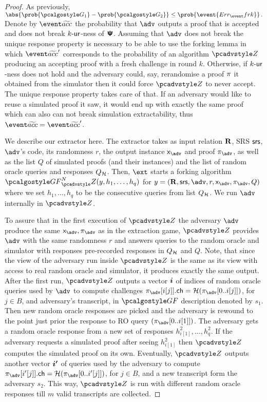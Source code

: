 \documentclass[runningheads,11pt]{llncs}
\def\vec#1{\mathchoice{\mbox{\boldmath$\displaystyle#1$}}
{\mbox{\boldmath$\textstyle#1$}} {\mbox{\boldmath$\scriptstyle#1$}}
{\mbox{\boldmath$\scriptscriptstyle#1$}}}
\theoremstyle{definition} \newtheorem{definition}[theorem]{Definition}
\begin{document}
\begin{proof}
   As previously, \( \abs{\prob{\game{1}} -
    \prob{\game{2}}} \leq \prob{\event{\errfrk}}\,. \) Denote by $\waccProb$ the
  probability that $\advse$ outputs a proof that is accepted and does not break
  ${k\text{-}\mathsf{ur}}$-ness of $\bm{\mathsf{\Psi}}$. Assuming that $\advse$ does not break the unique
  response property is necessary to be able to use the forking lemma in which
  $\waccProb'$ corresponds to the probability of an algorithm $\zdv$ producing
  an accepting proof with a fresh challenge in round $k$. Otherwise, if
  ${k\text{-}\mathsf{ur}}$-ness does not hold and the adversary could, say, rerandomise a proof
  $\pi$ it obtained from the simulator then it could force $\zdv$ to never
  accept. The unique response property takes care of that. If an adversary would
  like to reuse a simulated proof it saw, it would end up with exactly the same
  proof which can also can not break simulation extractability, thus
  $\waccProb=\waccProb'$.

  We describe our extractor here. The extractor takes as input relation $\mathbf{R}$,
  SRS $\mathsf{srs}$, $\advse$'s code, its randomness $r$, the output instance
  $\inp_{\advse}$ and proof $\zkproof_{\advse}$, as well as the list $Q$ of
  simulated proofs (and their instances) and the list of random oracle queries
  and responses $Q_{\mathcal{H}}$. Then, $\ext$ starts a forking algorithm
  $\genforking^{N}_\zdv(y,h_1, \ldots, h_q)$ for $y = (\REL, \srs, \advse, r,
  \inp_{\advse}, \zkproof_{\advse}, Q)$ where we set $h_1, \ldots, h_q$ to be
  the consecutive queries from list $Q_{\mathcal{H}}$. We run $\advse$ internally in
  $\zdv$.

  To assure that in the first execution of $\zdv$ the adversary $\advse$ produce
  the same $\inp_{\advse}, \zkproof_{\advse}$ as in the extraction game, $\zdv$
  provides $\advse$ with the same randomness $r$ and answers queries to the
  random oracle and simulator with responses pre-recorded responses in $Q_{\mathcal{H}}$
  and $Q$.
%
  Note, that since the view of the adversary run inside $\zdv$ is the same as
  its view with access to real random oracle and simulator, it produces exactly
  the same output. After the first run, $\zdv$ outputs a vector $\vec{i}$ of
  indices of random oracle queries used by $\advse$ to compute challenges
  $\zkproof_{\advse}[i[j]].\ch = \ro(\zkproof_{\advse}[0..i[j]])$, for $j \in
  B$, and adversary's transcript, in $\genforking$ description denoted by $s_1$.
  Then new random oracle responses are picked and the adversary is rewound to
  the point just prior the response to RO query $(\zkproof_{\advse}[0..i[1]])$.
  The adversary gets a random oracle response from a new set of responses
  $h^2_{i[1]}, \ldots, h^2_q$. If the adversary requests a simulated proof after
  seeing $h^2_{i[1]}$ then $\zdv$ computes the simulated proof on its own.
  Eventually, $\zdv$ outputs another vector $\vec{i'}$ of queries used by the
  adversary to compute $\zkproof_{\advse}[i'[j]].\ch =
  \ro(\zkproof_{\advse}[0..i'[j]])$, for $j \in B$, and a new transcript form
  the adversary $s_2$. This way, $\zdv$ is run with different random oracle
  responses till $m$ valid transcripts are collected.


\end{proof}
\end{document}
